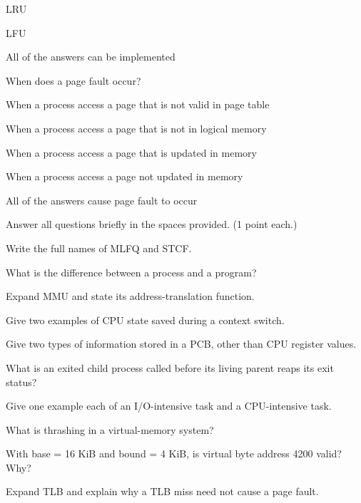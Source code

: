\begin{questions}
\begin{verticalchoices}
\item LRU
\item LFU
\item All of the answers can be implemented
\end{verticalchoices}
\question When does a page fault occur?
\begin{verticalchoices}
\item When a process access a page that is not valid in page table
\item When a process access a page that is not in logical memory
\item When a process access a page that is updated in memory
\item When a process access a page not updated in memory
\item All of the answers cause page fault to occur
\end{verticalchoices}
\end{questions}\endgroup\vfill\newpage

\begingroup\small
\noindent Answer all questions briefly in the spaces provided. (1 point each.)\par\smallskip
\begin{questions}\setlength{\itemsep}{0.12cm}
\question Write the full names of MLFQ and STCF.\par\vspace{1.40cm}
\question What is the difference between a process and a program?\par\vspace{1.40cm}
\question Expand MMU and state its address-translation function.\par\vspace{1.40cm}
\question Give two examples of CPU state saved during a context switch.\par\vspace{1.40cm}
\question Give two types of information stored in a PCB, other than CPU register values.\par\vspace{1.40cm}
\question What is an exited child process called before its living parent reaps its exit status?\par\vspace{1.40cm}
\question Give one example each of an I/O-intensive task and a CPU-intensive task.\par\vspace{1.40cm}
\question What is thrashing in a virtual-memory system?\par\vspace{1.40cm}
\question With base = 16 KiB and bound = 4 KiB, is virtual byte address 4200 valid? Why?\par\vspace{1.40cm}
\question Expand TLB and explain why a TLB miss need not cause a page fault.\par\vspace{1.40cm}
\end{questions}\endgroup\vfill\newpage

